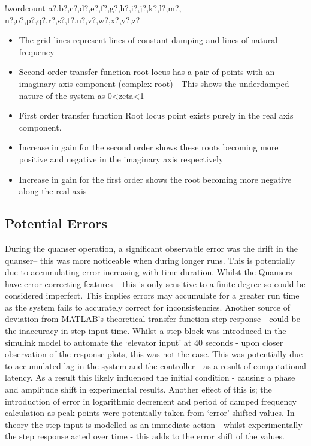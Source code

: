 \documentclass[11pt]{article}
\providecommand{\tightlist}{%
  \setlength{\itemsep}{0pt}\setlength{\parskip}{0pt}}
\newcounter{words}
\newenvironment{counted}{%
  \setcounter{words}{0}
  \SearchList!{wordcount}{\stepcounter{words}}
    {a?,b?,c?,d?,e?,f?,g?,h?,i?,j?,k?,l?,m?,
    n?,o?,p?,q?,r?,s?,t?,u?,v?,w?,x?,y?,z?}
  \UndoBoundary{'}
  \SearchOrder{p;}}{%
  \StopSearching}
\begin{document}
\begin{counted}
\begin{itemize}
\tightlist
\item
  The grid lines represent lines of constant damping and lines of
  natural frequency
\item
  Second order transfer function root locus has a pair of points with an
  imaginary axis component (complex root) - This shows the underdamped
  nature of the system as 0\textless{}zeta\textless{}1
\item
  First order transfer function Root locus point exists purely in the
  real axis component.
\item
  Increase in gain for the second order shows these roots becoming more
  positive and negative in the imaginary axis respectively
\item
  Increase in gain for the first order shows the root becoming more
  negative along the real axis
\end{itemize}

\subsection{Potential Errors}\label{potential-errors}

During the quanser operation, a significant observable error was the
drift in the quanser-- this was more noticeable when during longer runs.
This is potentially due to accumulating error increasing with time
duration. Whilst the Quansers have error correcting features -- this is
only sensitive to a finite degree so could be considered imperfect. This
implies errors may accumulate for a greater run time as the system fails
to accurately correct for inconsistencies. Another source of deviation
from MATLAB's theoretical transfer function step response - could be the
inaccuracy in step input time. Whilst a step block was introduced in the
simulink model to automate the `elevator input' at 40 seconds - upon
closer observation of the response plots, this was not the case. This
was potentially due to accumulated lag in the system and the controller
- as a result of computational latency. As a result this likely
influenced the initial condition - causing a phase and amplitude shift
in experimental results. Another effect of this is; the introduction of
error in logarithmic decrement and period of damped frequency
calculation as peak points were potentially taken from `error' shifted
values. In theory the step input is modelled as an immediate action -
whilst experimentally the step response acted over time - this adds to
the error shift of the values.


\end{counted}
\end{document}

